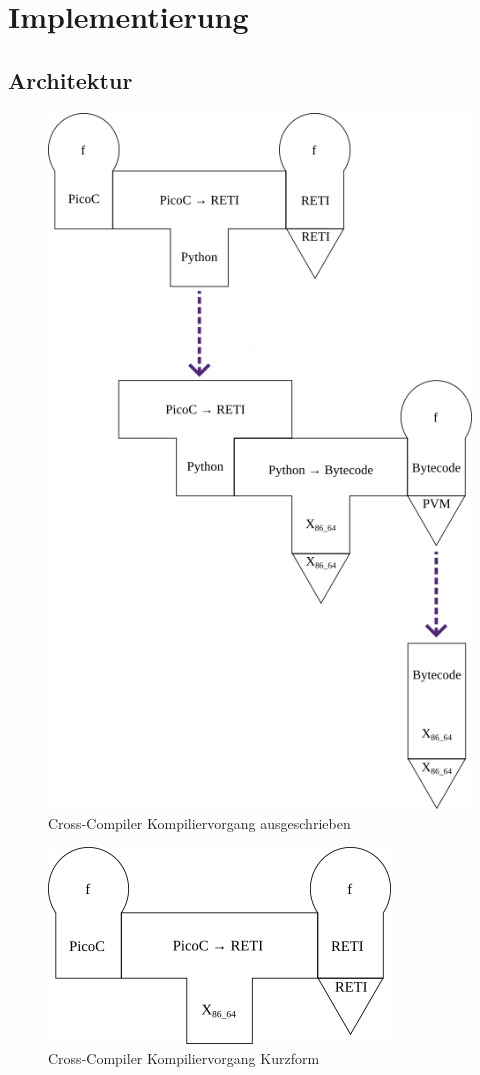 
\chapter{Implementierung}
\label{ch:implementierung}
\section{Architektur}

\begin{figure}
  \centering
  \includegraphics[width=0.5\linewidth]{./figures/summarized_cross_compiler.png}
  \caption{Cross-Compiler Kompiliervorgang ausgeschrieben}
\end{figure}

\begin{figure}
  \centering
  \includegraphics[width=0.33\linewidth]{./figures/compiliervorang_mit_machiene.png}
  \caption{Cross-Compiler Kompiliervorgang Kurzform}
\end{figure}

